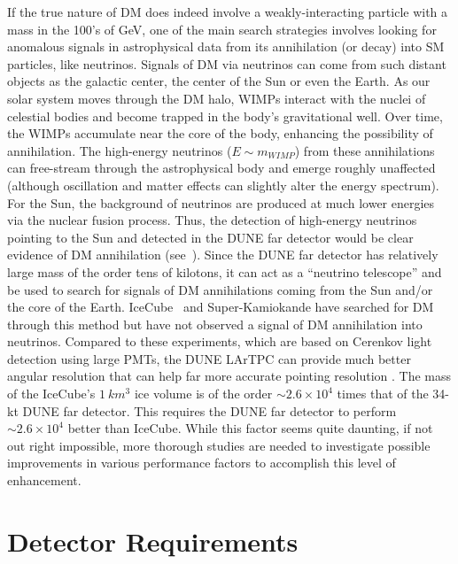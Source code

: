 If the true nature of DM does indeed involve a weakly-interacting particle with a mass in the 100's of 
GeV, one of the main search strategies involves looking for anomalous signals in astrophysical data 
from its annihilation (or decay) into SM particles, like neutrinos. Signals of DM via neutrinos can come 
from such distant objects as the galactic center, the center of the Sun or even the Earth. As our solar 
system moves through the DM halo, WIMPs interact with the nuclei of celestial bodies and become 
trapped in the body's gravitational well.  Over time, the WIMPs accumulate near the core of the body, 
enhancing the possibility of annihilation. The high-energy neutrinos ($E\sim m_{WIMP}$) from these 
annihilations can free-stream through the astrophysical body and emerge roughly unaffected (although 
oscillation and matter effects can slightly alter the energy spectrum).  For the Sun, the background of 
neutrinos are produced at much lower energies via the nuclear fusion process. Thus, the detection of 
high-energy neutrinos pointing to the Sun and detected in the DUNE far detector would be clear 
evidence of DM annihilation (see~\cite{Cirelli:2005gh}).  Since the DUNE far detector has relatively large mass 
of the order tens of kilotons, it can act as a ``neutrino telescope'' and be used to search for signals of 
DM annihilations coming from the Sun and/or the core of the Earth. IceCube~\cite{Aartsen:2012kia} and 
Super-Kamiokande have searched for DM through this method but have not observed a signal of DM 
annihilation into neutrinos. Compared to these experiments, which are based on Cerenkov light 
detection using large PMTs, the DUNE LArTPC can provide much better angular resolution that can help 
far more accurate pointing resolution .  The mass of the 
IceCube's $1~km^{3}$ ice volume is of the order $\sim2.6 \times 10^{4}$ times that of the 34-kt DUNE 
far detector. This requires the DUNE far detector to perform $\sim2.6 \times 10^{4}$ better than 
IceCube. While this factor seems quite daunting, if not out right impossible, more thorough studies are 
needed to investigate possible improvements in various performance factors to accomplish this level of 
enhancement. 

\section{Detector Requirements}
\label{sec:physics-atmpdk-detector-requirements}
